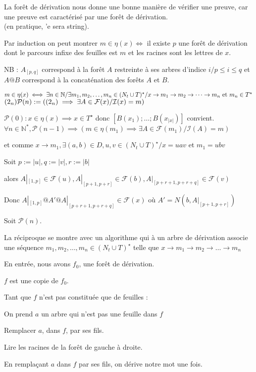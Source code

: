 \documentclass[a4paper,10pt
]{article}
\newcommand{\norm}[1]{\lvert #1 \rvert}
\newlength{\mydepth}
\newlength{\myheight}
\newenvironment{answer}
{\par\begin{lrbox}{\mybox}\quad\begin{minipage}{\linewidth}\color{black}\setlength{\parskip}{10pt plus 1pt minus 1pt}\vspace*{-.7\baselineskip}}
{\end{minipage}\end{lrbox}
\settodepth{\mydepth}{\usebox{\mybox}}
\settoheight{\myheight}{\usebox{\mybox}}
\addtolength{\myheight}{\mydepth}
\noindent\makebox[0pt]{
  \color{gray}\hspace{-0pt}\rule[-\mydepth]{1pt}{\myheight}}
  \usebox{\mybox}
  }
\begin{document}
La forêt de dérivation nous donne une bonne manière de vérifier une preuve, car une preuve est caractérisé par une forêt de dérivation.\\

(en pratique, 'e sera string).

Par induction on peut montrer $m \in \eta(x) \iff $ il existe $p$ une forêt de dérivation dont le parcours infixe des feuilles est $m$ et les racines sont les lettres de $x$.

{\color{gray} NB : $A_{[p,q]}$ correspond à la forêt $A$ restreinte à ses arbres d'indice $i / p\leq i \leq q$ et $A@B$ correspond à la concaténation des forêts $A$ et $B$. }\\

\begin{answer} 
$
m \in \eta(x)\\
\iff \exists n \in \mathbb{N} / \exists m_1,m_2,\dots,m_n \in (N_t \cup T)^\star / x \rightarrow m_1 \rightarrow m_2 \rightarrow \dots \rightarrow m_n\text{ et }m_n \in T^\star$    $ (2_n)\\
\mathcal{P}(n) := ((2_n) \implies \exists A \in \mathcal{F}(x) / \mathcal{I}(x) = m)$\\
\begin{answer} 
$\mathcal{P}(0) : x \in \eta(x) \implies x \in T^\star$ donc $[B (x_1);\dots;B (x_{\norm{x}})]$ convient.\\
$\forall n \in \mathbb{N}^*,\mathcal{P}(n-1) \implies (m \in \eta(m_1) \implies \exists A \in \mathcal{F}(m_1)/ \mathcal{I}(A) = m)$

 et comme $x\rightarrow m_1,\exists (a,b) \in D, u,v\in (N_t\cup T)^\star /x = uav$ et $m_1 = ubv$

 Soit $p := \norm{u}, q := \norm{v}, r := \norm{b}$
 
 alors $A|_{[1,p]} \in \mathcal{F}(u), A|_{[p+1,p+r]} \in \mathcal{F}(b), A|_{[p+r+1,p+r+q]} \in \mathcal{F}(v)$

 Donc $A|_{[1,p]}@A'@A|_{[p+r+1,p+r+q]}\in \mathcal{F}(x)$ où $A' = N (b,A|_{[p+1,p+r]})$

 Soit $\mathcal{P}(n)$.
\end{answer}
\end{answer}
La réciproque se montre avec un algorithme qui à un arbre de dérivation associe une séquence $m_1,m_2,\dots,m_n \in (N_t \cup T)^\star$ telle que $x \rightarrow m_1 \rightarrow m_2 \rightarrow \dots \rightarrow m_n$

En entrée, nous avons $f_0$, une forêt de dérivation.
\begin{answer} 
$f$ est une copie de $f_0$. 

Tant que $f$ n'est pas constituée que de feuilles :

\begin{answer} 
    On prend $a$ un arbre qui n'est pas une feuille dans $f$

    Remplacer $a$, dans $f$, par ses fils.

    Lire les racines de la forêt de gauche à droite.
\end{answer}
\end{answer}
En remplaçant $a$ dans $f$ par ses fils, on dérive notre mot une fois.\\\\
\end{document}
